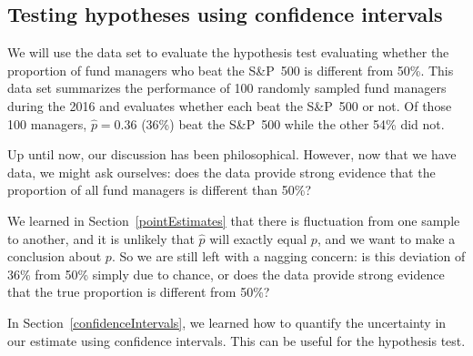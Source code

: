 





\subsection{Testing hypotheses using confidence intervals}
\label{utilizingOurCI}


We will use the  data set to evaluate
the hypothesis test evaluating whether the proportion of fund
managers who beat the S\&P~500 is different from 50\%. This
data set summarizes the performance of 100 randomly sampled
fund managers during the 2016 and evaluates whether each
beat the S\&P~500 or not. Of those 100 managers,
$\hat{p} = 0.36$ (36\%) beat the S\&P~500 while the other
54\% did not.

Up until now, our discussion has been philosophical.
However, now that we have data, we might ask ourselves:
does the data provide strong evidence that the proportion
of all fund managers is different than 50\%?

We learned in Section~\ref{pointEstimates} that there is
fluctuation from one sample to another, and it is unlikely
that $\hat{p}$ will exactly equal $p$, and we want to make
a conclusion about $p$. So we are still left with a nagging
concern: is this deviation of 36\% from 50\% simply due to
chance, or does the data provide strong evidence that the
true proportion is different from 50\%?

In Section~\ref{confidenceIntervals}, we learned how to
quantify the uncertainty in our estimate using confidence
intervals. This can be useful for the hypothesis test.

